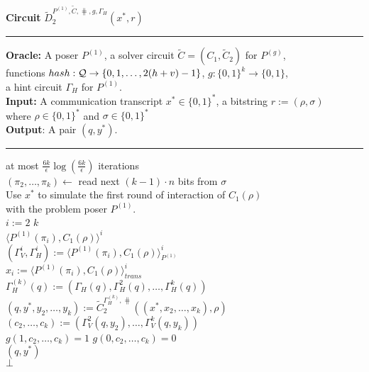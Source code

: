 %
\begin{codeblock}
  \textbf{Circuit} $\widetilde{D}_2^{P^{(1)}, \widetilde{C}, \hash, g,  \Gamma_H}(x^*, r)$
  \medskip \hrule
  \textbf{Oracle:} A poser $P^{(1)}$, a solver circuit $\widetilde{C} = (C_1, \widetilde{C}_2)$ for $P^{(g)}$, \\
  \IndII functions $hash : \mathcal{Q} \rightarrow \{0,1, \dots, 2(h+v)-1\}$, $g:\{0,1\}^k \rightarrow \{0,1\}$, \\
  \IndII a hint circuit $\Gamma_H$ for $P^{(1)}$. \\
  \textbf{Input:} A communication transcript $x^* \in \{0,1\}^{*}$, a bitstring $r := (\rho, \sigma)$ \\
  \IndII where $\rho \in \{0,1\}^{*}$ and $\sigma \in \{0,1\}^{*}$\\
  \textbf{Output}: A pair $(q, y^*)$.
  \medskip \hrule
  \For at most $\frac{6k}{\epsilon} \log(\frac{6k}{\epsilon})$ iterations \Do \\
  \IndI $(\pi_2, \dots, \pi_k) \leftarrow$ read next $(k-1)\cdot n$ bits from $\sigma$ \\
  \IndI Use $x^*$ to simulate the first round of interaction of $C_1(\rho)$ \\
  \IndI with the problem poser $P^{(1)}$.\\
  \IndI \For $i:=2$ \To $k$ \Do \\
  \IndII \Run $\langle P^{(1)}(\pi_i), C_1(\rho)\rangle^i$ \\
  \IndIII $(\Gamma_V^{i}, \Gamma_H^{i}) := \langle P^{(1)}(\pi_i), C_1(\rho) \rangle^i_{P^{(1)}}$ \\
  \IndIII $x_i := \langle P^{(1)}(\pi_i), C_1(\rho) \rangle^i_{\mathit{trans}}$ \\
  \IndI $\Gamma_H^{(k)}(q) := (\Gamma_H(q), \Gamma_H^{2}(q), \dots, \Gamma_H^{k}(q))$ \\
  \IndI $(q, y^*, y_2, \dots, y_k) := \widetilde{C}_2^{\Gamma_H^{(k)}, \hash}((x^*, x_2, \dotsc, x_k), \rho)$\\
  \IndI $(c_2, \dots, c_k) := (\Gamma_V^2(q, y_2), \dotsc, \Gamma_V^{k}(q, y_k))$ \\
  \IndI \If $g(1, c_{2}, \dots, c_k) = 1$ \And $g(0,c_{2}, \dots, c_k) = 0$ \Then \\
  \IndII \Return $(q, y^*)$ \\
  \Return $\bot$
%
\end{codeblock}
%
%
